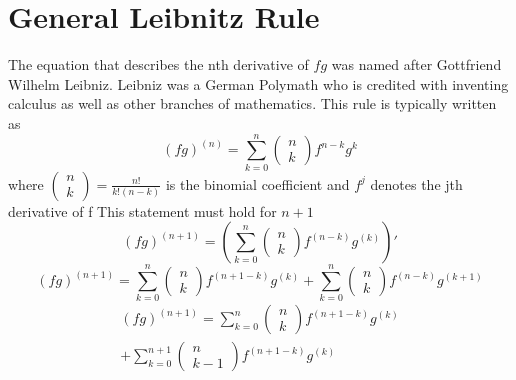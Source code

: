 \documentclass[12pt]{article}
\begin{document}
\section{General Leibnitz Rule}
    The equation that describes the nth derivative of $fg$ was named after Gottfriend Wilhelm Leibniz. Leibniz was a German Polymath who is credited with inventing calculus as well as other branches of mathematics. 
    \newline This rule is typically written as
    \begin{equation} \label{eq: 6.1}
        {(fg)}^{(n)} = \sum_{k=0}^n \begin{pmatrix} n\\ k \end{pmatrix} f^{n-k} g^k
    \end{equation}
    where $\begin{pmatrix} n\\ k \end{pmatrix} = \frac{n!}{k!(n-k)}$ is the binomial coefficient 
    \newline and $f^j$ denotes the jth derivative of f
    \newline This statement must hold for $n+1$
    \begin{equation} \label{eq: 6.2}
        {(fg)}^{(n+1)} = \left(\sum_{k=0}^{n} \begin{pmatrix} n\\ k \end{pmatrix} f^{(n-k)} g^{(k)}\right)'
    \end{equation}
    \begin{equation} \label{eq: 6.3}
        {(fg)}^{(n+1)} = \sum_{k=0}^{n} \begin{pmatrix} n\\ k \end{pmatrix} f^{(n+1-k)} g^{(k)} + \sum_{k=0}^{n} \begin{pmatrix} n\\ k \end{pmatrix} f^{(n-k)} g^{(k+1)}
    \end{equation}
    \begin{equation} \label{eq: 6.4}
        \begin{split}
        {(fg)}^{(n+1)} = \sum_{k=0}^{n} \begin{pmatrix} n\\ k \end{pmatrix} f^{(n+1-k)} g^{(k)} 
        \\+ \sum_{k=0}^{n+1} \begin{pmatrix} n\\ k-1 \end{pmatrix} f^{(n+1-k)} g^{(k)}
        \end{split}
    \end{equation}
\end{document}
